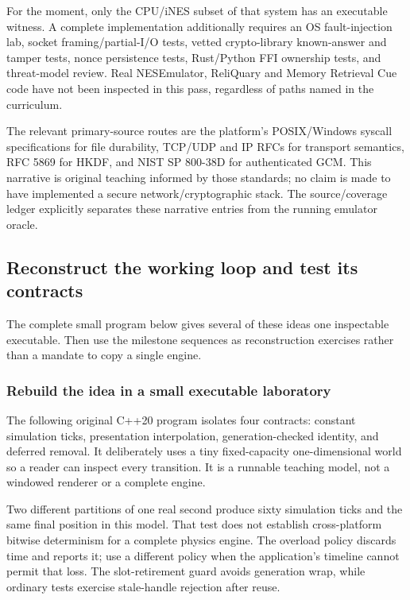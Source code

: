 For the moment, only the CPU/iNES subset of that system has an executable witness. A complete implementation additionally requires an OS fault-injection lab, socket framing/partial-I/O tests, vetted crypto-library known-answer and tamper tests, nonce persistence tests, Rust/Python FFI ownership tests, and threat-model review. Real NESEmulator, ReliQuary and Memory Retrieval Cue code have not been inspected in this pass, regardless of paths named in the curriculum.

The relevant primary-source routes are the platform's POSIX/Windows syscall specifications for file durability, TCP/UDP and IP RFCs for transport semantics, RFC 5869 for HKDF, and NIST SP 800-38D for authenticated GCM. This narrative is original teaching informed by those standards; no claim is made to have implemented a secure network/cryptographic stack. The source/coverage ledger explicitly separates these narrative entries from the running emulator oracle.

\subsection{Reconstruct the working loop and test its contracts}\label{06-engine-ii-ch042-reconstruct-the-working-loop-and-test-its-contracts}

\hypertarget{06-engine-ii-ch042-reconstruct-the-working-loop-and-test-its-contracts}{}

The complete small program below gives several of these ideas one inspectable executable. Then use the milestone sequences as reconstruction exercises rather than a mandate to copy a single engine.

\subsubsection{Rebuild the idea in a small executable laboratory}\label{06-engine-ii-ch042-rebuild-the-idea-in-a-small-executable-laboratory}

\hypertarget{06-engine-ii-ch042-rebuild-the-idea-in-a-small-executable-laboratory}{}

The following original C++20 program isolates four contracts: constant simulation ticks, presentation interpolation, generation-checked identity, and deferred removal. It deliberately uses a tiny fixed-capacity one-dimensional world so a reader can inspect every transition. It is a runnable teaching model, not a windowed renderer or a complete engine.

Two different partitions of one real second produce sixty simulation ticks and the same final position in this model. That test does not establish cross-platform bitwise determinism for a complete physics engine. The overload policy discards time and reports it; use a different policy when the application's timeline cannot permit that loss. The slot-retirement guard avoids generation wrap, while ordinary tests exercise stale-handle rejection after reuse.

